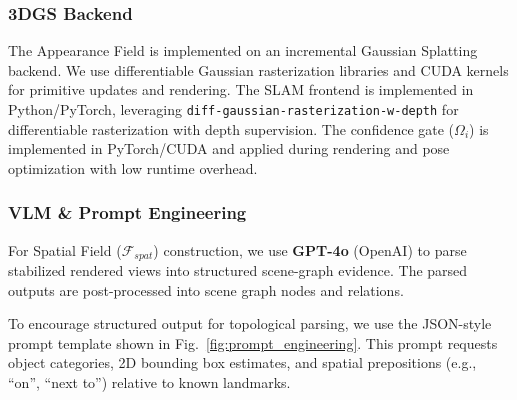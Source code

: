 \documentclass[conference]{IEEEtran}
\begin{document}
\subsubsection{3DGS Backend}

The Appearance Field is implemented on an incremental Gaussian Splatting backend. We use differentiable Gaussian rasterization libraries and CUDA kernels for primitive updates and rendering. The SLAM frontend is implemented in Python/PyTorch, leveraging \texttt{diff-gaussian-rasterization-w-depth} for differentiable rasterization with depth supervision. The confidence gate ($\Omega_i$) is implemented in PyTorch/CUDA and applied during rendering and pose optimization with low runtime overhead.



\subsubsection{VLM \& Prompt Engineering}

For Spatial Field ($\mathcal{F}_{spat}$) construction, we use \textbf{GPT-4o} (OpenAI) to parse stabilized rendered views into structured scene-graph evidence. The parsed outputs are post-processed into scene graph nodes and relations.



To encourage structured output for topological parsing, we use the JSON-style prompt template shown in Fig.~\ref{fig:prompt_engineering}. This prompt requests object categories, 2D bounding box estimates, and spatial prepositions (e.g., ``on'', ``next to'') relative to known landmarks.
\end{document}
